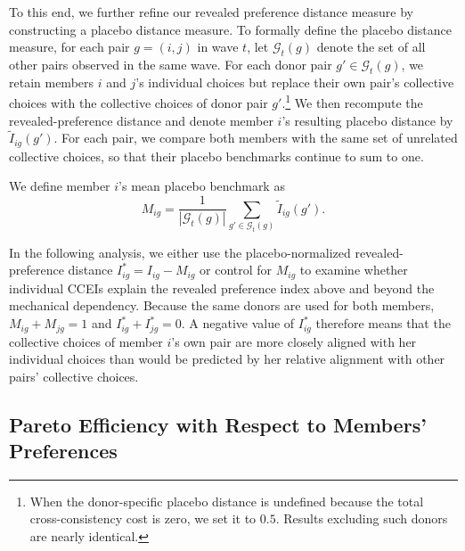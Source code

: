 \documentclass[11 pt]{article}
\begin{document}
To this end, we further refine our revealed preference distance measure by constructing a placebo distance measure. %
To formally define the placebo distance measure, for each pair $g=(i,j)$ in wave $t$, let $\mathcal{G}_t(g)$ denote the set of
all other pairs observed in the same wave. For each donor pair
$g'\in\mathcal{G}_t(g)$, we retain members $i$ and $j$'s individual choices
but replace their own pair's collective choices with the collective choices
of donor pair $g'$.\footnote{When the donor-specific placebo distance is undefined because the total cross-consistency cost is zero, we set it to $0.5$. Results excluding such donors are nearly identical.} We then recompute the revealed-preference distance and
denote member $i$'s resulting placebo distance by
$\widetilde I_{ig}(g')$. For each pair, we compare both members with the same set of unrelated collective choices, so that their placebo benchmarks continue to sum to one.

We define member $i$'s mean placebo benchmark as
\begin{equation}\label{eq:placebo}
M_{ig}
=
\frac{1}{|\mathcal{G}_t(g)|}
\sum_{g'\in\mathcal{G}_t(g)}
\widetilde I_{ig}(g').
\end{equation}

In the following analysis, we either use the placebo-normalized revealed-preference distance $
I^*_{ig}=I_{ig}-M_{ig}$ or control for $M_{ig}$ to examine whether individual CCEIs explain the revealed preference index above and beyond the mechanical dependency.  Because the same donors are used for both members, $M_{ig}+M_{jg}=1$ and $I^*_{ig}+I^*_{jg}=0$. A negative value of $I^*_{ig}$ therefore means that the collective choices of member $i$'s own pair are more closely aligned with her individual choices than would be predicted by her relative alignment with other pairs' collective choices.




\subsection{Pareto Efficiency with Respect to Members' Preferences}\label{subsec:collective_rationalizability}
\end{document}
